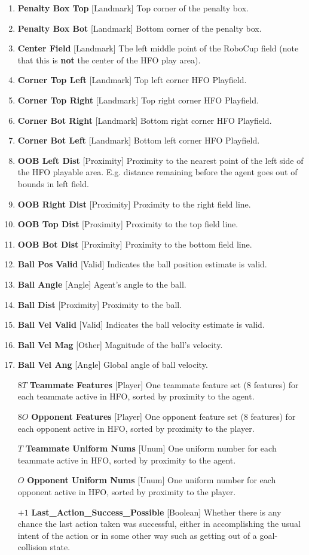 \documentclass[12pt]{article}
\def\itemrange#1{%
\addtocounter{enumi}{1}%
\edef\labelenumi{\theenumi--\noexpand\theenumi}%
\addtocounter{enumi}{-1}%
\addtocounter{enumi}{#1}%
\item
\def\labelenumi{\theenumi}}
\renewcommand*{\labelenumi}{\theenumi}
\begin{document}
\begin{enumerate}[noitemsep]
  \itemrange{2}{\textbf{Penalty Box Top} [Landmark] Top corner of the penalty box.}
  \itemrange{2}{\textbf{Penalty Box Bot} [Landmark] Bottom corner of the penalty box.}
  \itemrange{2}{\textbf{Center Field} [Landmark] The left middle point of the RoboCup field
    (note that this is \textbf{not} the center of the HFO play area).}
  \itemrange{2}{\textbf{Corner Top Left} [Landmark] Top left corner HFO Playfield.}
  \itemrange{2}{\textbf{Corner Top Right} [Landmark] Top right corner HFO Playfield.}
  \itemrange{2}{\textbf{Corner Bot Right} [Landmark] Bottom right corner HFO Playfield.}
  \itemrange{2}{\textbf{Corner Bot Left} [Landmark] Bottom left corner HFO Playfield.}
  \item{\textbf{OOB Left Dist} [Proximity] Proximity to the nearest
    point of the left side of the HFO playable area. E.g. distance
    remaining before the agent goes out of bounds in left field.}
  \item{\textbf{OOB Right Dist} [Proximity] Proximity to the right
    field line.}
  \item{\textbf{OOB Top Dist} [Proximity] Proximity to the top field line.}
  \item{\textbf{OOB Bot Dist} [Proximity] Proximity to the bottom field line.}
  \item{\textbf{Ball Pos Valid} [Valid] Indicates the ball position estimate is valid.}
  \itemrange{1}{\textbf{Ball Angle} [Angle] Agent's angle to the ball.}
  \item{\textbf{Ball Dist} [Proximity] Proximity to the ball.}
  \item{\textbf{Ball Vel Valid} [Valid] Indicates the ball velocity estimate is valid.}
  \item{\textbf{Ball Vel Mag} [Other] Magnitude of the ball's velocity.}
  \itemrange{1}{\textbf{Ball Vel Ang} [Angle] Global angle of ball velocity.}
  \item [$8T$] {\textbf{Teammate Features} [Player] One teammate feature set (8 features)
	for each teammate active in HFO, sorted by proximity to the agent.}
  \item [$8O$] {\textbf{Opponent Features} [Player] One opponent feature set (8 features)
	for each opponent active in HFO, sorted by proximity to the player.}
  \item [$T$]  {\textbf{Teammate Uniform Nums} [Unum] One uniform number for each teammate active in HFO,
	sorted by proximity to the agent.}
  \item [$O$]  {\textbf{Opponent Uniform Nums} [Unum] One uniform number for each opponent active in HFO,
	sorted by proximity to the player.}
  \item [$+1$]  {\textbf{Last\_Action\_Success\_Possible} [Boolean] Whether there is any chance
		the last action taken was successful, either in accomplishing the
		usual intent of the action or in some other way such as getting out of
		a goal-collision state.}
\end{enumerate}
\end{document}
